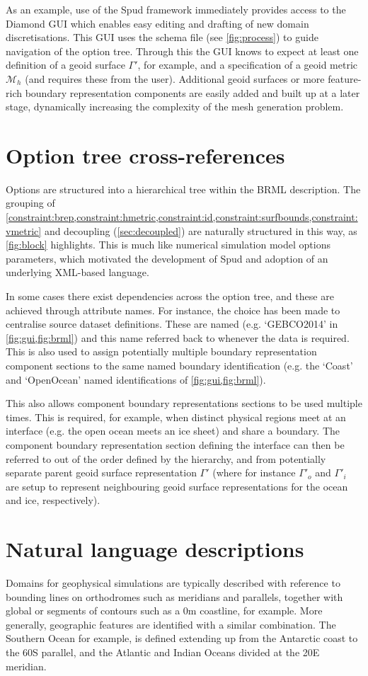 \documentclass[a4paper, 10pt]{book}
\providecommand{\brml}{BRML\xspace}
\providecommand{\brep}{boundary representation\xspace}
\providecommand{\breps}{boundary representations\xspace}
\newcommand{\constraints}{\cref{constraint:brep,constraint:hmetric,constraint:id,constraint:surfbounds,constraint:vmetric}\xspace}
\begin{document}
As an example, use of the Spud framework immediately provides access to the Diamond GUI
which enables easy editing and drafting of new domain discretisations.
%
This GUI uses the schema file (see \cref{fig:process}) to guide navigation of the option tree.
%
Through this the GUI knows to expect at least one definition of a geoid surface $\Gamma'$, for example, and a specification of a geoid metric $\mathcal{M}_h$
(and requires these from the user). 
%
Additional geoid surfaces or more feature-rich boundary representation components are easily added and built up at a later stage, dynamically increasing the complexity of the mesh generation problem.

\section{Option tree cross-references}
Options are structured into a hierarchical tree within the \brml description.
%
The grouping of \constraints and decoupling (\cref{sec:decoupled})
are naturally structured in this way, as \cref{fig:block} highlights.
This is much like numerical simulation model options parameters,
which motivated the development of Spud and adoption of an underlying XML-based language.
%

In some cases there exist dependencies across the option tree,
and these are achieved through attribute names.
For instance, the choice has been made to centralise source dataset definitions.
These are named (e.g. `GEBCO2014' in \cref{fig:gui,fig:brml}) and this name referred back to whenever the data is required.
This is also used to assign potentially multiple \brep component sections to the 
same named boundary identification (e.g. the `Coast' and `OpenOcean' named identifications of \cref{fig:gui,fig:brml}).

This also allows component \breps sections to be used multiple times.
This is required, for example, when distinct physical regions meet at an interface
(e.g. the open ocean meets an ice sheet) and share a boundary.
%
The component \brep section defining the interface can then be referred to out of the order defined by the hierarchy,
and from potentially separate parent geoid surface representation
$\Gamma'$
(where for instance $\Gamma'_o$ and $\Gamma'_i$ are setup to represent neighbouring geoid surface representations for the ocean and ice, respectively).




\section{Natural language descriptions}
%
Domains for geophysical simulations are typically described with reference to bounding lines on orthodromes such as meridians and parallels,
together with global or segments of contours such as a 0m coastline, for example.
%
More generally, geographic features are identified with a similar combination.
The Southern Ocean for example, is defined extending up from the Antarctic coast to the 60\degree S parallel, and the Atlantic and Indian Oceans divided at the 20\degree E meridian.
%
\end{document}

